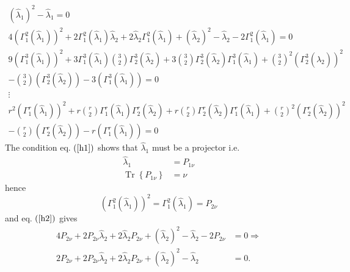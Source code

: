 \documentclass[aps,preprint]{revtex4}%
\begin{document}
\begin{gather}
\left(  \hat{\lambda}_{1}\right)  ^{2}-\hat{\lambda}_{1}=0\label{h1}\\
4\left(  \Gamma_{1}^{2}\left(  \hat{\lambda}_{1}\right)  \right)  ^{2}%
+2\Gamma_{1}^{2}\left(  \hat{\lambda}_{1}\right)  \hat{\lambda}_{2}%
+2\hat{\lambda}_{2}\Gamma_{1}^{2}\left(  \hat{\lambda}_{1}\right)  +\left(
\hat{\lambda}_{2}\right)  ^{2}-\hat{\lambda}_{2}-2\Gamma_{1}^{2}\left(
\hat{\lambda}_{1}\right)  =0\label{h2}\\
9\left(  \Gamma_{1}^{3}\left(  \hat{\lambda}_{1}\right)  \right)  ^{2}%
+3\Gamma_{1}^{3}\left(  \hat{\lambda}_{1}\right)  \binom{3}{2}\Gamma_{2}%
^{3}\left(  \hat{\lambda}_{2}\right)  +3\binom{3}{2}\Gamma_{2}^{3}\left(
\hat{\lambda}_{2}\right)  \Gamma_{1}^{3}\left(  \hat{\lambda}_{1}\right)
+\binom{3}{2}^{2}\left(  \Gamma_{2}^{3}\left(  \hat{\lambda}_{2}\right)
\right)  ^{2}\nonumber\\
\left.  -\right.  \binom{3}{2}\left(  \Gamma_{2}^{3}\left(  \hat{\lambda}%
_{2}\right)  \right)  -3\left(  \Gamma_{1}^{3}\left(  \hat{\lambda}%
_{1}\right)  \right)  =0\label{h3}\\
\vdots\nonumber\\
r^{2}\left(  \Gamma_{1}^{r}\left(  \hat{\lambda}_{1}\right)  \right)
^{2}+r\binom{r}{2}\Gamma_{1}^{r}\left(  \hat{\lambda}_{1}\right)  \Gamma
_{2}^{r}\left(  \hat{\lambda}_{2}\right)  +r\binom{r}{2}\Gamma_{2}^{r}\left(
\hat{\lambda}_{2}\right)  \Gamma_{1}^{r}\left(  \hat{\lambda}_{1}\right)
+\binom{r}{2}^{2}\left(  \Gamma_{2}^{r}\left(  \hat{\lambda}_{2}\right)
\right)  ^{2}\nonumber\\
\left.  -\right.  \binom{r}{2}\left(  \Gamma_{2}^{r}\left(  \hat{\lambda}%
_{2}\right)  \right)  -r\left(  \Gamma_{1}^{r}\left(  \hat{\lambda}%
_{1}\right)  \right)  =0 \label{hr}%
\end{gather}
The condition eq. $\left(  \ref{h1}\right)  $ shows that $\hat{\lambda}_{1}$
must be a projector i.e.
\begin{align}
\hat{\lambda}_{1}  &  =P_{1\nu}\\
\operatorname*{Tr}\left\{  P_{1\nu}\right\}   &  =\nu
\end{align}
hence
\begin{equation}
\left(  \Gamma_{1}^{2}\left(  \hat{\lambda}_{1}\right)  \right)  ^{2}%
=\Gamma_{1}^{2}\left(  \hat{\lambda}_{1}\right)  =P_{2\nu}%
\end{equation}
and eq. $\left(  \ref{h2}\right)  $ gives
\begin{align}
4P_{2\nu}+2P_{2\nu}\hat{\lambda}_{2}+2\hat{\lambda}_{2}P_{2\nu}+\left(
\hat{\lambda}_{2}\right)  ^{2}-\hat{\lambda}_{2}-2P_{2\nu}  &  =0\Rightarrow\\
2P_{2\nu}+2P_{2\nu}\hat{\lambda}_{2}+2\hat{\lambda}_{2}P_{2\nu}+\left(
\hat{\lambda}_{2}\right)  ^{2}-\hat{\lambda}_{2}  &  =0.
\end{align}
\end{document}
